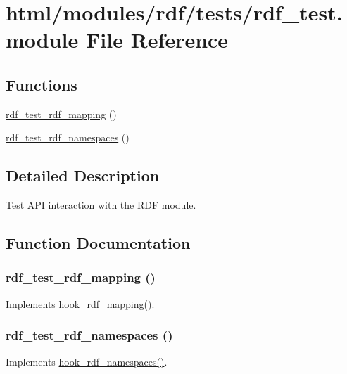 \hypertarget{rdf__test_8module}{
\section{html/modules/rdf/tests/rdf\_\-test.module File Reference}
\label{rdf__test_8module}
}
\subsection*{Functions}
\begin{DoxyCompactItemize}
\item 
\hyperlink{rdf__test_8module_aa1e3f43430bd39b0ae8e96f30d80ff54}{rdf\_\-test\_\-rdf\_\-mapping} ()
\item 
\hyperlink{rdf__test_8module_a3d62d405f756466015b8c5e866e1a5b8}{rdf\_\-test\_\-rdf\_\-namespaces} ()
\end{DoxyCompactItemize}


\subsection{Detailed Description}
Test API interaction with the RDF module. 

\subsection{Function Documentation}
\hypertarget{rdf__test_8module_aa1e3f43430bd39b0ae8e96f30d80ff54}{
\subsubsection[{rdf\_\-test\_\-rdf\_\-mapping}]{\setlength{\rightskip}{0pt plus 5cm}rdf\_\-test\_\-rdf\_\-mapping ()}}
\label{rdf__test_8module_aa1e3f43430bd39b0ae8e96f30d80ff54}
Implements \hyperlink{group__rdf_gae3e7f047bdcb9309b323e2af09966765}{hook\_\-rdf\_\-mapping()}. \hypertarget{rdf__test_8module_a3d62d405f756466015b8c5e866e1a5b8}{
\subsubsection[{rdf\_\-test\_\-rdf\_\-namespaces}]{\setlength{\rightskip}{0pt plus 5cm}rdf\_\-test\_\-rdf\_\-namespaces ()}}
\label{rdf__test_8module_a3d62d405f756466015b8c5e866e1a5b8}
Implements \hyperlink{group__rdf_ga32e59c5e172304a5f49ec7d76ee6bf3b}{hook\_\-rdf\_\-namespaces()}. 